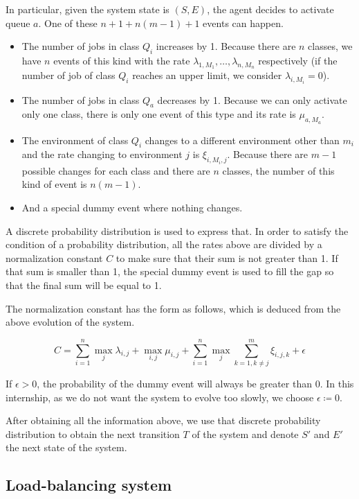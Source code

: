 \documentclass[
  a4paper, xcolor = usenames,dvipsnames]{article}
\providecommand{\tightlist}{%
  \setlength{\itemsep}{0pt}\setlength{\parskip}{0pt}}
\theoremstyle{definition}
\theoremstyle{definition}
\theoremstyle{definition}
\theoremstyle{definition}
\theoremstyle{remark}
\begin{document}
In particular, given the system state is \((S, E)\), the agent decides to activate queue \(a\). One of these \(n + 1 + n(m - 1) + 1\) events can happen.

\begin{itemize}
\tightlist
\item
  The number of jobs in class \(Q_{i}\) increases by 1. Because there are \(n\) classes, we have \(n\) events of this kind with the rate \(\lambda_{1, M_{1}}, \dots, \lambda_{n, M_{n}}\) respectively (if the number of job of class \(Q_{i}\) reaches an upper limit, we consider \(\lambda_{i, M_{i}} = 0\)).
\item
  The number of jobs in class \(Q_{a}\) decreases by 1. Because we can only activate only one class, there is only one event of this type and its rate is \(\mu_{a, M_{a}}\).
\item
  The environment of class \(Q_{i}\) changes to a different environment other than \(m_{i}\) and the rate changing to environment \(j\) is \(\xi_{i, M_{i}, j}\). Because there are \(m - 1\) possible changes for each class and there are \(n\) classes, the number of this kind of event is \(n(m - 1)\).
\item
  And a special dummy event where nothing changes.
\end{itemize}

A discrete probability distribution is used to express that. In order to satisfy the condition of a probability distribution, all the rates above are divided by a normalization constant \(C\) to make sure that their sum is not greater than 1. If that sum is smaller than 1, the special dummy event is used to fill the gap so that the final sum will be equal to 1.

The normalization constant has the form as follows, which is deduced from the above evolution of the system.

\[
C = \sum_{i = 1}^{n} \max_{j} \lambda_{i, j} + \max_{i, j} \mu_{i, j} + \sum_{i = 1}^{n} \max_{j} \sum_{k = 1, k \neq j}^{m} \xi_{i, j, k} + \epsilon
\]

If \(\epsilon > 0\), the probability of the dummy event will always be greater than 0. In this internship, as we do not want the system to evolve too slowly, we choose \(\epsilon \coloneq 0\).

After obtaining all the information above, we use that discrete probability distribution to obtain the next transition \(T\) of the system and denote \(S'\) and \(E'\) the next state of the system.

\hypertarget{load-balancing-system}{%
\subsection{Load-balancing system}\label{load-balancing-system}}
\end{document}
